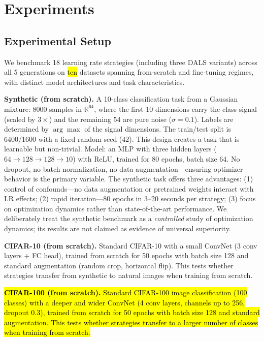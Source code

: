 \documentclass[a4paper,fleqn]{cas-dc}
\begin{document}
\section{Experiments}\label{sec:experiments}

\subsection{Experimental Setup}

We benchmark 18 learning rate strategies (including three DALS variants) across all 5 generations on \hl{ten} datasets spanning from-scratch and fine-tuning regimes, with distinct model architectures and task characteristics.

\textbf{Synthetic (from scratch).} A 10-class classification task from a Gaussian mixture: 8000 samples in $\mathbb{R}^{64}$, where the first 10 dimensions carry the class signal (scaled by $3\times$) and the remaining 54 are pure noise ($\sigma = 0.1$). Labels are determined by $\arg\max$ of the signal dimensions. The train/test split is 6400/1600 with a fixed random seed (42). This design creates a task that is learnable but non-trivial. Model: an MLP with three hidden layers ($64\to128\to128\to10$) with ReLU, trained for 80 epochs, batch size 64. No dropout, no batch normalization, no data augmentation---ensuring optimizer behavior is the primary variable. The synthetic task offers three advantages: (1) control of confounds---no data augmentation or pretrained weights interact with LR effects; (2) rapid iteration---80 epochs in 3--20 seconds per strategy; (3) focus on optimization dynamics rather than state-of-the-art performance. We deliberately treat the synthetic benchmark as a \emph{controlled} study of optimization dynamics; its results are not claimed as evidence of universal superiority.

\textbf{CIFAR-10 (from scratch).} Standard CIFAR-10 with a small ConvNet (3 conv layers + FC head), trained from scratch for 50 epochs with batch size 128 and standard augmentation (random crop, horizontal flip). This tests whether strategies transfer from synthetic to natural images when training from scratch.

\hl{\textbf{CIFAR-100 (from scratch).} Standard CIFAR-100 image classification (100 classes) with a deeper and wider ConvNet (4 conv layers, channels up to 256, dropout 0.3), trained from scratch for 50 epochs with batch size 128 and standard augmentation. This tests whether strategies transfer to a larger number of classes when training from scratch.}
\end{document}
